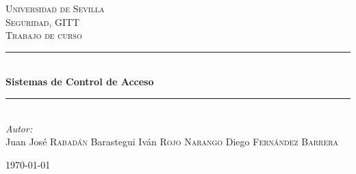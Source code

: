 \documentclass{article} %
\begin{document}

\begin{titlepage}

\newcommand{\HRule}{\rule{\linewidth}{0.5mm}} %

\center %

\textsc{\LARGE Universidad de Sevilla}\\[1.5cm] %
\textsc{\Large Seguridad, GITT}\\[0.5cm] %
\textsc{\large Trabajo de curso}\\[0.5cm] %

\HRule \\[0.4cm]
{ \huge \bfseries Sistemas de Control de Acceso}\\[0.4cm] %
\HRule \\[1.5cm]

\large
\emph{Autor:}\\

Juan José \textsc{Rabadán} Barastegui
Iván \textsc{Rojo Narango}
Diego \textsc{Fernández Barrera}

\hspace{3cm}

{\large \today}\\ %

\vfill %

\end{titlepage}

\end{document}
